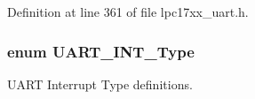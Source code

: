\-Definition at line 361 of file lpc17xx\-\_\-uart.\-h.

\hypertarget{group___u_a_r_t___public___types_ga7ee4c5ddc0e165158d0d9f1f03e1b66c}{
\subsubsection[{\-U\-A\-R\-T\-\_\-\-I\-N\-T\-\_\-\-Type}]{\setlength{\rightskip}{0pt plus 5cm}enum {\bf \-U\-A\-R\-T\-\_\-\-I\-N\-T\-\_\-\-Type}}}\label{group___u_a_r_t___public___types_ga7ee4c5ddc0e165158d0d9f1f03e1b66c}


\-U\-A\-R\-T \-Interrupt \-Type definitions. 

